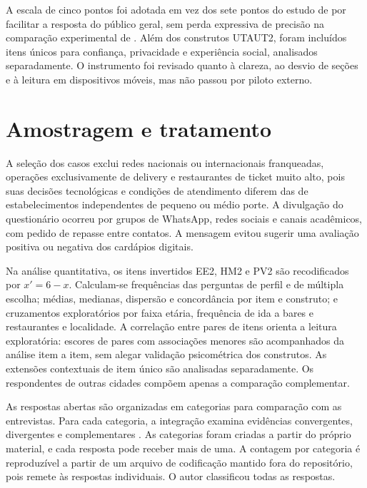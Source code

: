A escala de cinco pontos foi adotada em vez dos sete pontos do estudo de  por facilitar a resposta do público geral, sem perda expressiva de precisão na comparação experimental de . Além dos construtos UTAUT2, foram incluídos itens únicos para confiança, privacidade e experiência social, analisados separadamente. O instrumento foi revisado quanto à clareza, ao desvio de seções e à leitura em dispositivos móveis, mas não passou por piloto externo.

\section{Amostragem e tratamento}

A seleção dos casos exclui redes nacionais ou internacionais franqueadas, operações exclusivamente de delivery e restaurantes de ticket muito alto, pois suas decisões tecnológicas e condições de atendimento diferem das de estabelecimentos independentes de pequeno ou médio porte. A divulgação do questionário ocorreu por grupos de WhatsApp, redes sociais e canais acadêmicos, com pedido de repasse entre contatos. A mensagem evitou sugerir uma avaliação positiva ou negativa dos cardápios digitais.

Na análise quantitativa, os itens invertidos EE2, HM2 e PV2 são recodificados por $x' = 6-x$. Calculam-se frequências das perguntas de perfil e de múltipla escolha; médias, medianas, dispersão e concordância por item e construto; e cruzamentos exploratórios por faixa etária, frequência de ida a bares e restaurantes e localidade. A correlação entre pares de itens orienta a leitura exploratória: escores de pares com associações menores são acompanhados da análise item a item, sem alegar validação psicométrica dos construtos. As extensões contextuais de item único são analisadas separadamente. Os respondentes de outras cidades compõem apenas a comparação complementar.

As respostas abertas são organizadas em categorias para comparação com as entrevistas. Para cada categoria, a integração examina evidências convergentes, divergentes e complementares \cite{venkatesh2013bridging}. As categorias foram criadas a partir do próprio material, e cada resposta pode receber mais de uma. A contagem por categoria é reproduzível a partir de um arquivo de codificação mantido fora do repositório, pois remete às respostas individuais. O autor classificou todas as respostas.
